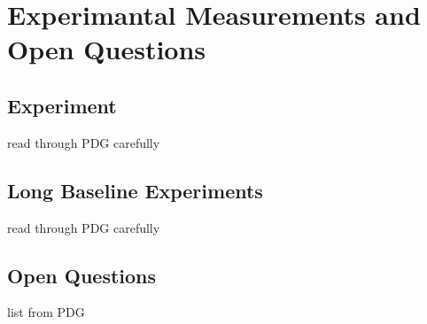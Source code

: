 \section{Experimantal Measurements and Open Questions}
\subsection{Experiment}
read through PDG carefully
\subsection{Long Baseline Experiments}
read through PDG carefully
\subsection{Open Questions}
list from PDG
